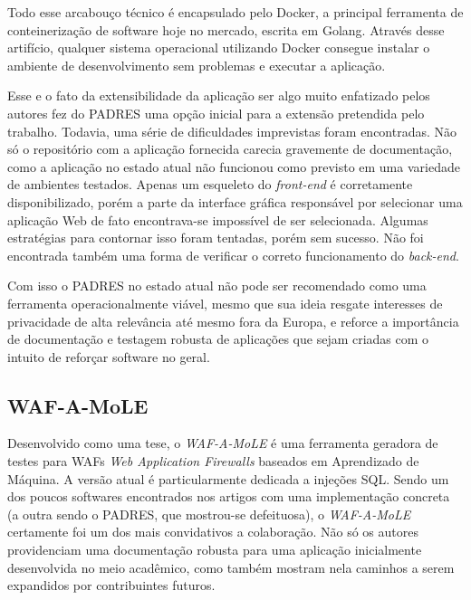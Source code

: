 Todo esse arcabouço técnico é encapsulado pelo Docker, a principal ferramenta de conteinerização de software hoje no mercado, escrita em Golang. Através desse artifício, qualquer sistema operacional utilizando Docker consegue instalar o ambiente de desenvolvimento sem problemas e executar a aplicação.

Esse e o fato da extensibilidade da aplicação ser algo muito enfatizado pelos autores fez do PADRES uma opção inicial para a extensão pretendida pelo trabalho. Todavia, uma série de dificuldades imprevistas foram encontradas. Não só o repositório com a aplicação fornecida carecia gravemente de documentação, como a aplicação no estado atual não funcionou como previsto em uma variedade de ambientes testados. Apenas um esqueleto do \textit{front-end} é corretamente disponibilizado, porém a parte da interface gráfica responsável por selecionar uma aplicação Web de fato encontrava-se impossível de ser selecionada. Algumas estratégias para contornar isso foram tentadas, porém sem sucesso. Não foi encontrada também uma forma de verificar o correto funcionamento do \textit{back-end}.

Com isso o PADRES no estado atual não pode ser recomendado como uma ferramenta operacionalmente viável, mesmo que sua ideia resgate interesses de privacidade de alta relevância até mesmo fora da Europa, e reforce a importância de documentação e testagem robusta de aplicações que sejam criadas com o intuito de reforçar software no geral. 

\subsection{WAF-A-MoLE}

Desenvolvido como uma tese, o \textit{WAF-A-MoLE} \cite{valenza_waf--mole_2020} é uma ferramenta geradora de testes para WAFs \textit{Web Application Firewalls} baseados em Aprendizado de Máquina. A versão atual é particularmente dedicada a injeções SQL. Sendo um dos poucos softwares encontrados nos artigos com uma implementação concreta (a outra sendo o PADRES, que mostrou-se defeituosa), o \textit{WAF-A-MoLE} certamente foi um dos mais convidativos a colaboração. Não só os autores providenciam uma documentação robusta para uma aplicação inicialmente desenvolvida no meio acadêmico, como também mostram nela caminhos a serem expandidos por contribuintes futuros.


